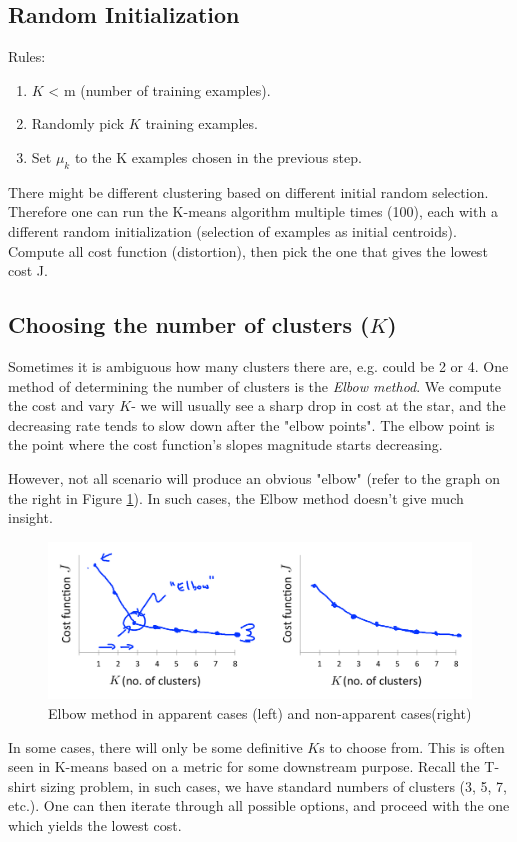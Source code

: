 \subsection{Random Initialization}
    Rules:
    \begin{enumerate}
        \item $K$ < m (number of training examples).
        \item Randomly pick $K$ training examples.
        \item Set $\mu_k$ to the K examples chosen in the previous step.
    \end{enumerate}

    There might be different clustering based on different initial random selection. Therefore one can run the K-means algorithm multiple times (100), each with a different random initialization (selection of examples as initial centroids). Compute all cost function (distortion), then pick the one that gives the lowest cost J.

\subsection{Choosing the number of clusters ($K$)}
    Sometimes it is ambiguous how many clusters there are, e.g. could be 2 or 4. One method of determining the number of clusters is the \emph{Elbow method}. We compute the cost and vary $K$- we will usually see a sharp drop in cost at the star, and the decreasing rate tends to slow down after the "elbow points". The elbow point is the point where the cost function's slopes magnitude starts decreasing. 

    \par However, not all scenario will produce an obvious "elbow" (refer to the graph on the right in Figure \ref{fig:elbow-method}). In such cases, the Elbow method doesn't give much insight.

    \begin{figure}[htpb]
        \centering
        \includegraphics[width=\textwidth]{image/elbow-method.png}
        \caption{Elbow method in apparent cases (left) and non-apparent cases(right)}
        \label{fig:elbow-method}
    \end{figure}

    \par In some cases, there will only be some definitive $K$s to choose from. This is often seen in K-means based on a metric for some downstream purpose. Recall the T-shirt sizing problem, in such cases, we have standard numbers of clusters (3, 5, 7, etc.). One can then iterate through all possible options, and proceed with the one which yields the lowest cost.
